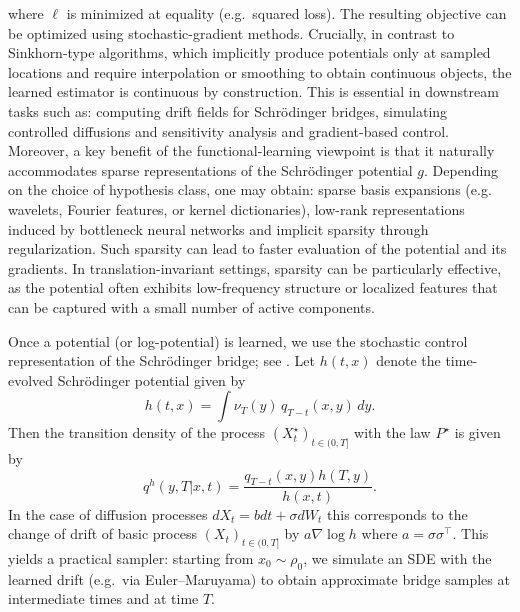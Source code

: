 \documentclass[11pt]{article}
\theoremstyle{remark}
\numberwithin{equation}{section}
\begin{document}
where $\ell$ is minimized at equality (e.g.\ squared loss). The resulting objective can be optimized using stochastic-gradient methods. Crucially, in contrast to Sinkhorn-type algorithms, which implicitly produce potentials only at sampled locations and require interpolation or smoothing to obtain continuous objects, the learned estimator is continuous by construction. This is essential in downstream tasks such as:
computing drift fields for Schrödinger bridges, simulating controlled diffusions and
sensitivity analysis and gradient-based control. Moreover, a key benefit of the functional-learning viewpoint is that it naturally accommodates sparse representations of the Schrödinger potential $g$. Depending on the choice of hypothesis class,  one may obtain: sparse basis expansions (e.g. wavelets, Fourier features, or kernel dictionaries), low-rank representations induced by bottleneck neural networks and
implicit sparsity through regularization. Such sparsity can lead to faster evaluation of the potential and its gradients. In translation-invariant settings, sparsity can be particularly effective, as the potential often exhibits low-frequency structure or localized features that can be captured with a small number of active components.
\par
Once a potential (or log-potential) is learned, we use the stochastic control representation of the Schr\"odinger bridge; see \citep{Daipra1991}. Let
\(h(t, x)\) denote the time-evolved Schrödinger potential given by
\[
    h(t, x) = \int \nu_T(y) \, q_{T-t}(x, y) \, dy.
\]
Then the transition density of the process $(X_t^\star)_{t \in (0, T]}$ with the law $P^\star$ is given by
\[
q^h(y, T | x, t) = \frac{q_{T-t}(x, y)h(T, y)}{h(x,t)}.
\]
In the case of diffusion processes  $dX_t = b dt + \sigma d W_t$ this corresponds to the change of drift of basic process $(X_t)_{t \in (0, T]}$ by $a \nabla \log h$ where $a = \sigma \sigma^\top$. This yields a practical sampler: starting from $x_0\sim\rho_0$, we simulate an SDE with the learned drift (e.g.\ via Euler--Maruyama) to obtain approximate bridge samples at intermediate times and at time $T$. 
\end{document}
